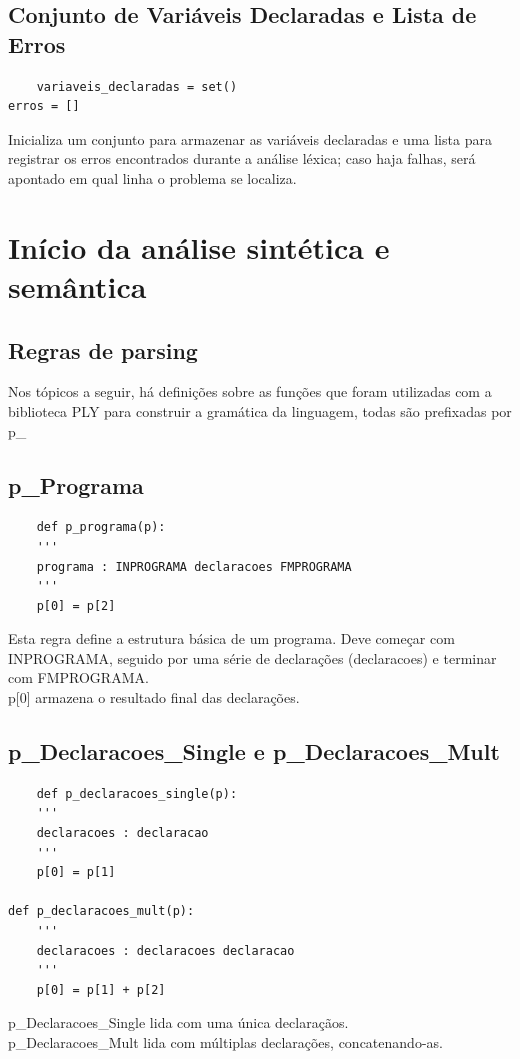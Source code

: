 \documentclass[a4paper,12pt]{article}
\begin{document}
\subsection{Conjunto de Variáveis Declaradas e Lista de Erros}
\begin{verbatim}
    variaveis_declaradas = set()
erros = []
\end{verbatim}
Inicializa um conjunto para armazenar as variáveis declaradas e uma 
lista para registrar os erros encontrados durante a análise léxica; caso 
haja falhas, será apontado em qual linha o problema se localiza.

\section{Início da análise sintética e semântica}

\subsection{Regras de parsing}
Nos tópicos a seguir, há definições sobre as funções que foram 
utilizadas com a biblioteca PLY para construir a gramática da linguagem, 
todas são prefixadas por p\_

\subsection{p\_Programa}
\begin{verbatim}
    def p_programa(p):
    '''
    programa : INPROGRAMA declaracoes FMPROGRAMA
    '''
    p[0] = p[2]
\end{verbatim}
Esta regra define a estrutura básica de um programa. Deve começar com 
INPROGRAMA, seguido por uma série de declarações (declaracoes) e 
terminar com FMPROGRAMA.\\

p[0] armazena o resultado final das declarações.

\subsection{p\_Declaracoes\_Single e p\_Declaracoes\_Mult}
\begin{verbatim}
    def p_declaracoes_single(p):
    '''
    declaracoes : declaracao
    '''
    p[0] = p[1]

def p_declaracoes_mult(p):
    '''
    declaracoes : declaracoes declaracao
    '''
    p[0] = p[1] + p[2]
\end{verbatim}
p\_Declaracoes\_Single lida com uma única declaraçãos.\\
p\_Declaracoes\_Mult lida com múltiplas declarações, concatenando-as.
\end{document}
